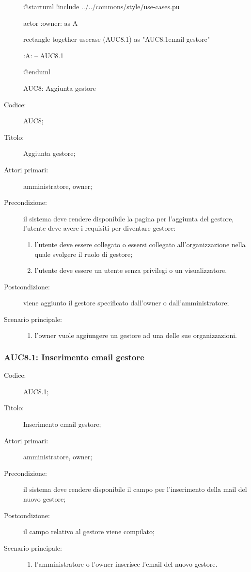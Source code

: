 \documentclass[../../../analisi-dei-requisiti.tex]{subfiles}
\begin{document}
\begin{figure}[H]
  \centering
  \begin{plantuml}
  @startuml
  !include ../../commons/style/use-cases.pu

  actor :owner: as A

  rectangle {
    together {
      usecase (AUC8.1) as "AUC8.1\nInserimento email gestore"
    }
  }

  :A: -- AUC8.1

  @enduml
  \end{plantuml}
  \caption{AUC8: Aggiunta gestore}%
  \label{fig:AUC8}
\end{figure}

\begin{description}
  \item[Codice:] AUC8;
  \item[Titolo:] Aggiunta gestore;
  \item[Attori primari:] amministratore, owner;
  \item[Precondizione:] il sistema deve rendere disponibile la pagina per l'aggiunta del gestore, l'utente deve avere i requisiti per diventare gestore:
  \begin{enumerate}
    \item l'utente deve essere collegato o essersi collegato all'organizzazione nella quale svolgere il ruolo di gestore;
    \item l'utente deve essere un utente senza privilegi o un visualizzatore.
  \end{enumerate}
  \item[Postcondizione:] viene aggiunto il gestore specificato dall'owner o dall'amministratore;
  \item[Scenario principale:]
  \begin{enumerate}
    \item l'owner vuole aggiungere un gestore ad una delle sue organizzazioni.
  \end{enumerate}
\end{description}

\subsubsection{AUC8.1: Inserimento email gestore}%
\label{subs:AUC8.1}
\begin{description}
  \item[Codice:] AUC8.1;
  \item[Titolo:] Inserimento email gestore;
  \item[Attori primari:] amministratore, owner;
  \item[Precondizione:] il sistema deve rendere disponibile il campo per l'inserimento della mail del nuovo gestore;
  \item[Postcondizione:] il campo relativo al gestore viene compilato;
  \item[Scenario principale:]
  \begin{enumerate}
    \item l'amministratore o l'owner inserisce l'email del nuovo gestore.
  \end{enumerate}
\end{description}
\end{document}
